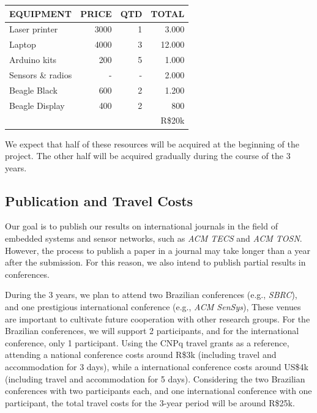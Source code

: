 \documentclass[12pt,english]{amsart}
\begin{document}
{\renewcommand{\arraystretch}{0.8}
\begin{tabular}{ | l | r | r | r | }
\hline			
EQUIPMENT       & PRICE & QTD   &   TOTAL   \\
\hline  
Laser printer   & 3000  &   1   &   3.000    \\
Laptop          & 4000  &   3   &  12.000    \\
Arduino kits    &  200  &   5   &   1.000    \\
Sensors \& radios & -   &   -   &   2.000    \\
Beagle Black    &  600  &   2   &   1.200    \\
Beagle Display  &  400  &   2   &     800    \\
\hline  
                &       &       &  R\$20k \\
\hline  
\end{tabular}
\newline
}

We expect that half of these resources will be acquired at the beginning of the
project.
The other half will be acquired gradually during the course of the 3 years.

\subsection{Publication and Travel Costs}

Our goal is to publish our results on international journals in the field of
embedded systems and sensor networks, such as \emph{ACM TECS} and \emph{ACM TOSN}.
%
However, the process to publish a paper in a journal may take longer than a year after
the submission.
For this reason, we also intend to publish partial results in conferences.

During the 3 years, we plan to attend two Brazilian conferences (e.g.,
\emph{SBRC}),
and one prestigious international conference (e.g., \emph{ACM SenSys}),
These venues are important to cultivate future cooperation with other research
groups.
For the Brazilian conferences, we will support 2 participants, and for the
international conference, only 1 participant.
%
Using the CNPq travel grants as a reference, attending a national conference
costs around R\$3k (including travel and accommodation for 3 days), while a 
international conference costs around US\$4k (including travel and
accommodation for 5 days).
Considering the two Brazilian conferences with two participants each, and one
international conference with one participant, the total travel costs for the
3-year period will be around R\$25k.
\end{document}
